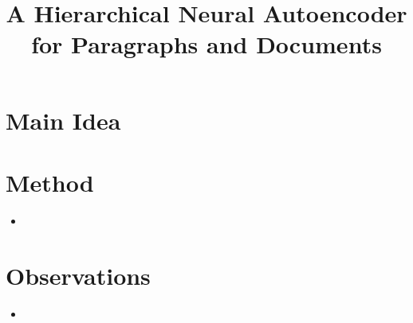 \documentclass[12pt]{scrartcl}
\begin{document}
\title{A Hierarchical Neural Autoencoder for Paragraphs and Documents}
\author{}
\date{}
\maketitle

\section{Main Idea}
  

\section{Method}
  \begin{itemize}
    \item 
  \end{itemize}

\section{Observations}
  \begin{itemize}
    \item 
  \end{itemize}



\end{document}
